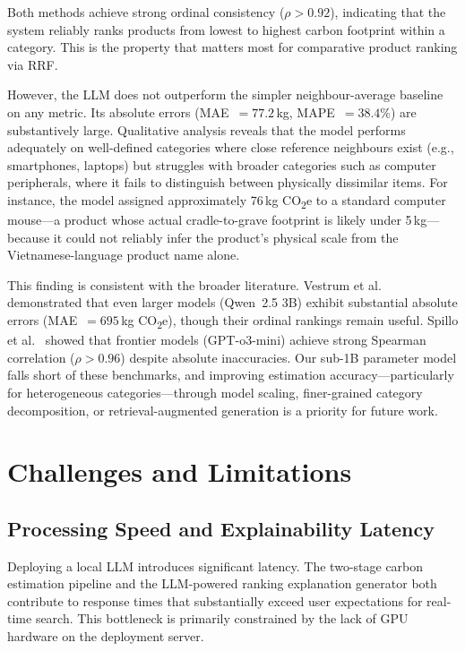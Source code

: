 \documentclass[conference]{IEEEtran}
\begin{document}
Both methods achieve strong ordinal consistency ($\rho > 0.92$), indicating that the system reliably ranks products from lowest to highest carbon footprint within a category. This is the property that matters most for comparative product ranking via RRF.

However, the LLM does not outperform the simpler neighbour-average baseline on any metric. Its absolute errors (MAE~$= 77.2$\,kg, MAPE~$= 38.4\%$) are substantively large. Qualitative analysis reveals that the model performs adequately on well-defined categories where close reference neighbours exist (e.g., smartphones, laptops) but struggles with broader categories such as computer peripherals, where it fails to distinguish between physically dissimilar items. For instance, the model assigned approximately 76\,kg CO\textsubscript{2}e to a standard computer mouse---a product whose actual cradle-to-grave footprint is likely under 5\,kg---because it could not reliably infer the product's physical scale from the Vietnamese-language product name alone.

This finding is consistent with the broader literature. Vestrum et al.~\cite{carbon_reranking} demonstrated that even larger models (Qwen~2.5 3B) exhibit substantial absolute errors (MAE~$= 695$\,kg CO\textsubscript{2}e), though their ordinal rankings remain useful. Spillo et al.~\cite{ecommerce_carbon} showed that frontier models (GPT-o3-mini) achieve strong Spearman correlation ($\rho > 0.96$) despite absolute inaccuracies. Our sub-1B parameter model falls short of these benchmarks, and improving estimation accuracy---particularly for heterogeneous categories---through model scaling, finer-grained category decomposition, or retrieval-augmented generation is a priority for future work.

\section{Challenges and Limitations}

\subsection{Processing Speed and Explainability Latency}

Deploying a local LLM introduces significant latency. The two-stage carbon estimation pipeline and the LLM-powered ranking explanation generator both contribute to response times that substantially exceed user expectations for real-time search. This bottleneck is primarily constrained by the lack of GPU hardware on the deployment server.
\end{document}
